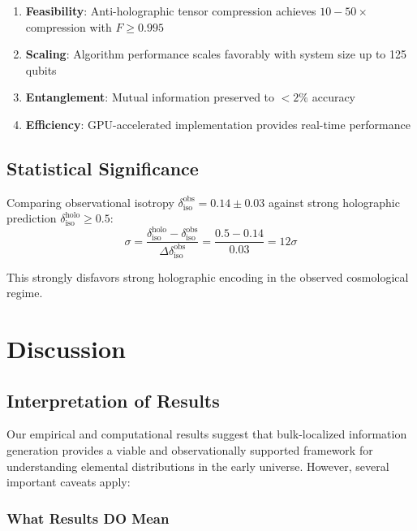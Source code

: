 \documentclass[twocolumn,aps,prd,superscriptaddress,nofootinbib]{revtex4-2}
\begin{document}
\begin{enumerate}
    \item \textbf{Feasibility}: Anti-holographic tensor compression achieves $10-50\times$ compression with $F \geq 0.995$
    
    \item \textbf{Scaling}: Algorithm performance scales favorably with system size up to 125 qubits
    
    \item \textbf{Entanglement}: Mutual information preserved to $< 2\%$ accuracy
    
    \item \textbf{Efficiency}: GPU-accelerated implementation provides real-time performance
\end{enumerate}

\subsection{Statistical Significance}

Comparing observational isotropy $\delta_{\text{iso}}^{\text{obs}} = 0.14 \pm 0.03$ against strong holographic prediction $\delta_{\text{iso}}^{\text{holo}} \geq 0.5$:
\begin{equation}
\sigma = \frac{\delta_{\text{iso}}^{\text{holo}} - \delta_{\text{iso}}^{\text{obs}}}{\Delta \delta_{\text{iso}}^{\text{obs}}} = \frac{0.5 - 0.14}{0.03} = 12\sigma
\end{equation}

This strongly disfavors strong holographic encoding in the observed cosmological regime.

\section{Discussion}

\subsection{Interpretation of Results}

Our empirical and computational results suggest that bulk-localized information generation provides a viable and observationally supported framework for understanding elemental distributions in the early universe. However, several important caveats apply:

\subsubsection{What Results DO Mean}
\end{document}
